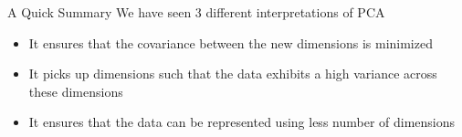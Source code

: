 \begin{frame}
  \begin{overlayarea}{\textwidth}{\textheight}
    \vspace{0.9cm}
    \begin{block}{A Quick Summary}
      We have seen 3 different interpretations of PCA
      \begin{itemize}\justifying
        \item<2-> It ensures that the covariance between the new dimensions is minimized
        \item<3-> It picks up dimensions such that the data exhibits a high variance across these dimensions
        \item<4-> It ensures that the data can be represented using less number of dimensions
      \end{itemize}
    \end{block}
  \end{overlayarea}
\end{frame}
